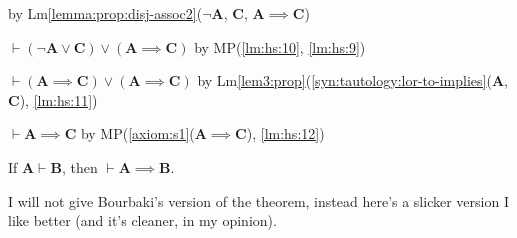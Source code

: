\documentclass{amsart}%
\newcommand\metavariable[1]{\boldsymbol{#1}}
\begin{document}
\begin{pf}
  by Lm\ref{lemma:prop:disj-assoc2}($\neg\metavariable{A}$, $\metavariable{C}$, $\metavariable{A}\implies\metavariable{C}$)
\item\label{lm:hs:11} $\vdash(\neg\metavariable{A}\lor\metavariable{C})\lor(\metavariable{A}\implies\metavariable{C})$
  by MP(\ref{lm:hs:10}, \ref{lm:hs:9})
\item\label{lm:hs:12} $\vdash(\metavariable{A}\implies\metavariable{C})\lor(\metavariable{A}\implies\metavariable{C})$
  by Lm\ref{lem3:prop}(\ref{syn:tautology:lor-to-implies}($\metavariable{A}$, $\metavariable{C}$), \ref{lm:hs:11})
\item $\vdash\metavariable{A}\implies\metavariable{C}$
  by MP(\ref{axiom:s1}($\metavariable{A}\implies\metavariable{C}$), \ref{lm:hs:12})
\end{pf}

\begin{dc}\label{dc:14}
If $\metavariable{A}\vdash\metavariable{B}$, then $\vdash\metavariable{A}\implies\metavariable{B}$.
\end{dc}

I will not give Bourbaki's version of the theorem, instead here's a
slicker version I like better (and it's cleaner, in my opinion).
\end{document}
